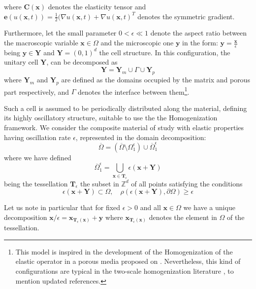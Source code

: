 where $\mathbf{C}(\mathbf{x})$ denotes the elasticity tensor and $\mathbf{e}(u(\mathbf{x},t)) = \frac{1}{2}\big( \nabla u(\mathbf{x},t) + \nabla u(\mathbf{x},t)^{T}$ denotes the symmetric gradient.


Furthermore, let the small parameter $0 < \epsilon \ll 1$ denote the aspect ratio between the macroscopic variable $\mathbf{x} \in \Omega$ and the microscopic one $\mathbf{y}$ in the form: $\mathbf{y} = \frac{\mathbf{x}}{\epsilon}$ being $\mathbf{y} \in \mathbf{Y}$ and $\mathbf{Y} = (0,1)^d$ the cell structure. In this configuration, the unitary cell $\mathbf{Y}$, can be decomposed as
\begin{equation*}
	\mathbf{Y} = \mathbf{Y}_m \cup \Gamma \cup \mathbf{Y}_p 
\end{equation*}
where $\mathbf{Y}_m$ and $\mathbf{Y}_p$ are defined as the domains occupied by the matrix and porous part respectively, and $\Gamma$ denotes the interface between them\footnote{This model is inspired in the development of the Homogenization of the elastic operator in a porous media proposed on \cite{christensen1982theory}. Nevertheless, this kind of configurations are typical in the two-scale homogenization literature \cite{panasenko2005multi-scale}, \cite{Boughammoura2013} to mention updated references.}.

Such a cell is assumed to be periodically distributed along the material, defining its highly oscillatory structure, suitable to use the the Homogenization framework. We consider the composite material of study with elastic properties having oscillation rate $\epsilon$, represented in the domain decomposition:
\begin{equation*}
	\overline{\Omega} = (\overline{\Omega}\setminus \Omega_1^{\epsilon}) \cup \overline{\Omega}^{\epsilon}_1
\end{equation*}
where we have defined
\begin{equation*}
    \overline{\Omega}^{\epsilon}_1 = \bigcup_{\mathbf{x} \in \mathbf{T}_{\epsilon}} \epsilon ( \mathbf{x} + \mathbf{Y} )
\end{equation*}
being the tessellation $\mathbf{T}_{\epsilon}$ the subset in $\mathbb{Z}^d$ of all points satisfying the conditions
\begin{equation*}
    \epsilon (\mathbf{x} + \mathbf{Y}) \subset \Omega, \quad \rho(\epsilon(\mathbf{x}+\mathbf{Y}), \partial \Omega) \geq \epsilon
\end{equation*}

Let us note in particular that for fixed $\epsilon >0$ and all $\mathbf{x} \in \Omega$ we have a unique decomposition $\mathbf{x}/\epsilon = \mathbf{x}_{\mathbf{T}_{\epsilon}(\mathbf{x})} + \mathbf{y}$ where $\mathbf{x}_{\mathbf{T}_{\epsilon}(\mathbf{x})}$ denotes the element in $\Omega$ of the tessellation.

